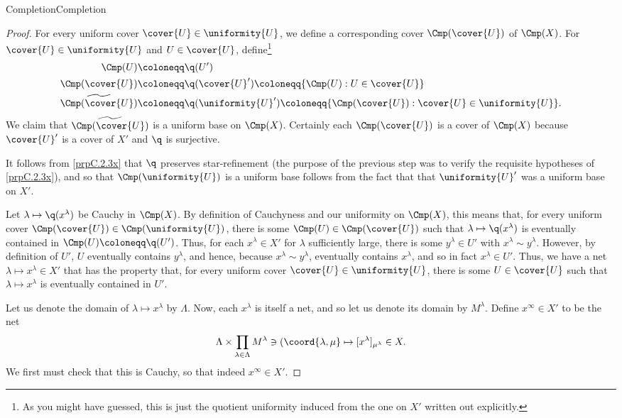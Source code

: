 \begin{thm}{Completion}{Completion}
\begin{proof}
For every uniform cover $\cover{U}\in \uniformity{U}$, we define a corresponding cover $\Cmp (\cover{U})$ of $\Cmp (X)$.  For $\cover{U}\in \uniformity{U}$ and $U\in \cover{U}$, define\footnote{As you might have guessed, this is just the quotient uniformity induced from the one on $X'$ written out explicitly.}
\begin{equation}
\begin{split}
\Cmp (U) & \coloneqq \q (U') \\
\Cmp (\cover{U}) & \coloneqq \q (\cover{U}')\coloneqq \{ \Cmp (U):U\in \cover{U}\} \\
\widetilde{\Cmp (\cover{U})} & \coloneqq \q (\uniformity{U}') \coloneqq \{ \Cmp (\cover{U}):\cover{U}\in \uniformity{U}\} .
\end{split}
\end{equation}
We claim that $\widetilde{\Cmp (\cover{U})}$ is a uniform base on $\Cmp (X)$.  Certainly each $\Cmp (\cover{U})$ is a cover of $\Cmp (X)$ because $\cover{U}'$ is a cover of $X'$ and $\q$ is surjective.

It follows from \cref{prpC.2.3x} that $\q$ preserves star-refinement (the purpose of the previous step was to verify the requisite hypotheses of \cref{prpC.2.3x}), and so that $\Cmp (\uniformity{U})$ is a uniform base follows from the fact that that $\uniformity{U}'$ was a uniform base on $X'$.

Let $\lambda \mapsto \q (x^\lambda )$ be Cauchy in $\Cmp (X)$.  By definition of Cauchyness and our uniformity on $\Cmp (X)$, this means that, for every uniform cover $\Cmp (\cover{U})\in \Cmp (\uniformity{U})$, there is some $\Cmp (U)\in \Cmp (\cover{U})$ such that $\lambda \mapsto \q (x^\lambda )$ is eventually contained in $\Cmp (U)\coloneqq \q (U')$.  Thus, for each $x^\lambda \in X'$ for $\lambda$ sufficiently large, there is some $y^\lambda \in U'$ with $x^\lambda \sim y^\lambda$.  However, by definition of $U'$, $U$ eventually contains $y^\lambda$, and hence, because $x^\lambda \sim y^\lambda$, eventually contains $x^\lambda$, and so in fact $x^\lambda \in U'$.  Thus, we have a net $\lambda \mapsto x^\lambda \in X'$ that has the property that, for every uniform cover $\cover{U}\in \uniformity{U}$, there is some $U\in \cover{U}$ such that $\lambda \mapsto x^\lambda$ is eventually contained in $U'$.

Let us denote the domain of $\lambda \mapsto x^\lambda$ by $\Lambda$.  Now, each $x^\lambda$ is itself a net, and so let us denote its domain by $M^\lambda$.  Define $x^\infty \in X'$ to be the net
\begin{equation}
\Lambda \times \prod _{\lambda \in \Lambda}M^\lambda \ni (\coord{\lambda ,\mu }\mapsto [x^\lambda ]_{\mu ^\lambda}\in X.
\end{equation}
We first must check that this is Cauchy, so that indeed $x^\infty \in X'$.


\end{proof}
\end{thm}
